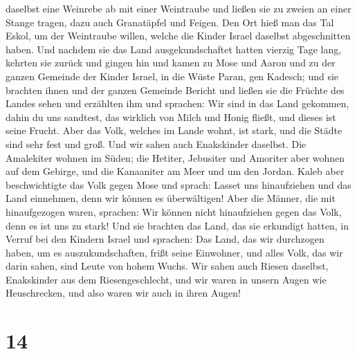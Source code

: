daselbst eine Weinrebe ab mit einer Weintraube und ließen sie zu zweien
an einer Stange tragen, dazu auch Granatäpfel und Feigen.
 Den Ort hieß man das Tal Eskol, um der Weintraube
willen, welche die Kinder Israel daselbst abgeschnitten haben.
 Und nachdem sie das Land ausgekundschaftet hatten
vierzig Tage lang,  kehrten sie zurück und gingen hin und
kamen zu Mose und Aaron und zu der ganzen Gemeinde der Kinder Israel, in
die Wüste Paran, gen Kadesch; und sie brachten ihnen und der ganzen
Gemeinde Bericht und ließen sie die Früchte des Landes sehen und
erzählten ihm und sprachen:  Wir sind in das Land
gekommen, dahin du uns sandtest, das wirklich von Milch und Honig
fließt, und dieses ist seine Frucht.  Aber das Volk,
welches im Lande wohnt, ist stark, und die Städte sind sehr fest und
groß. Und wir sahen auch Enakskinder daselbst.  Die
Amalekiter wohnen im Süden; die Hetiter, Jebusiter und Amoriter aber
wohnen auf dem Gebirge, und die Kanaaniter am Meer und um den Jordan.
 Kaleb aber beschwichtigte das Volk gegen Mose und
sprach: Lasset uns hinaufziehen und das Land einnehmen, denn wir können
es überwältigen!  Aber die Männer, die mit hinaufgezogen
waren, sprachen: Wir können nicht hinaufziehen gegen das Volk, denn es
ist uns zu stark!  Und sie brachten das Land, das sie
erkundigt hatten, in Verruf bei den Kindern Israel und sprachen: Das
Land, das wir durchzogen haben, um es auszukundschaften, frißt seine
Einwohner, und alles Volk, das wir darin sahen, sind Leute von hohem
Wuchs.  Wir sahen auch Riesen daselbst, Enakskinder aus
dem Riesengeschlecht, und wir waren in unsern Augen wie Heuschrecken,
und also waren wir auch in ihren Augen!

\hypertarget{section-13}{%
\section{14}\label{section-13}}

